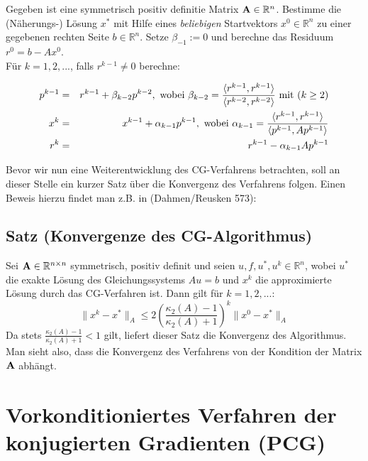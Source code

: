 Gegeben ist eine symmetrisch positiv definitie Matrix ${\textbf{A}} \in \mathbb{R}^{n}$. Bestimme die (Näherungs-) Lösung $x^{*}$ mit Hilfe eines \textit{beliebigen} Startvektors $x^{0} \in \mathbb{R}^{n}$ zu einer gegebenen rechten Seite $b \in \mathbb{R}^{n}$. Setze $\beta_{-1} := 0$ und berechne das Residuum $r^{0} = b - Ax^{0}$. \\
Für $k = 1,2,...$, falls $r^{k-1} \ne 0$ berechne:

\begin{eqnarray}
p^{k-1} &=& r^{k-1} + \beta_{k-2}p^{k-2}, \textnormal{ wobei } \beta_{k-2} = \frac {\langle r^{k-1}, r^{k-1} \rangle} {\langle r^{k-2}, r^{k-2} \rangle} \textnormal{ mit } (k \ge 2) \notag \\
x^{k} &=& x^{k-1} + \alpha_{k-1}p^{k-1}, \textnormal{ wobei } \alpha_{k-1} = \frac {\langle r^{k-1}, r^{k-1} \rangle} {\langle p^{k-1}, Ap^{k-1} \rangle} \notag \\
r^{k} &=& r^{k-1} - \alpha_{k-1}Ap^{k-1} \notag
\end{eqnarray}

Bevor wir nun eine Weiterentwicklung des CG-Verfahrens betrachten, soll an dieser Stelle ein kurzer Satz über die Konvergenz des Verfahrens folgen. Einen Beweis hierzu findet man z.B. in (Dahmen/Reusken 573):

\subsection{Satz (Konvergenze des CG-Algorithmus)}

Sei ${\textbf{A}} \in \mathbb{R}^{n \times n}$ symmetrisch, positiv definit und seien $u,f,u^{*},u^{k} \in \mathbb{R}^{n}$, wobei $u^{*}$ die exakte Lösung des Gleichungssystems $Au = b$ und $x^{k}$ die approximierte Lösung durch das CG-Verfahren ist. Dann gilt für $k = 1,2,...$:
\begin{equation}
\| x^{k} - x^{*} \|_{A} \le 2 \left( \frac {\kappa_{2} (A) - 1} {\kappa_{2} (A) + 1} \right)^{k} \| x^{0} - x^{*} \|_{A}
\end{equation}
Da stets $\frac {\kappa_{2} (A) - 1} {\kappa_{2} (A) + 1} < 1$ gilt, liefert dieser Satz die Konvergenz des Algorithmus. Man sieht also, dass die Konvergenz des Verfahrens von der Kondition der Matrix ${\textbf{A}}$ abhängt.

\section{Vorkonditioniertes Verfahren der konjugierten Gradienten (PCG)}

